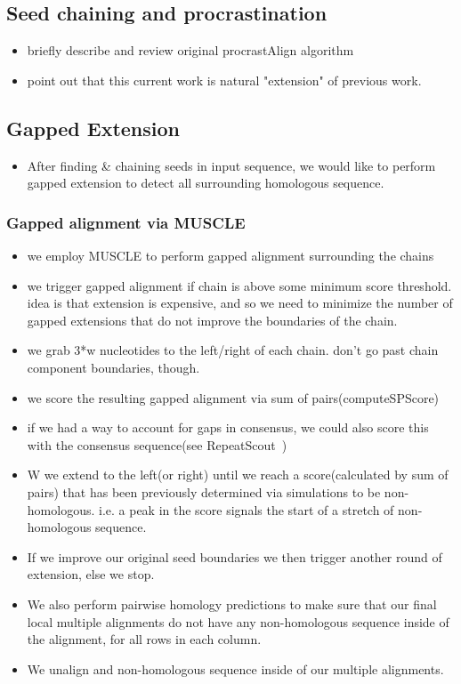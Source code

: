 \documentclass{llncs}
\begin{document}
\subsection{Seed chaining and procrastination}
\begin{itemize}
\item briefly describe and review original procrastAlign algorithm
\item point out that this current work is natural "extension" of previous work.
\end{itemize}
\subsection{Gapped Extension}
\begin{itemize}
\item After finding \& chaining seeds in input sequence, we would like to perform gapped
extension to detect all surrounding homologous sequence.
\end{itemize}
\subsubsection{Gapped alignment via MUSCLE}
\begin{itemize}
\item we employ MUSCLE to perform gapped alignment surrounding the chains

\item we trigger gapped alignment if chain is above some minimum score threshold.
idea is that extension is expensive, and so we need to minimize the number
of gapped extensions that do not improve the boundaries of the chain.

\item we grab 3*w nucleotides to the left/right of each chain. don't go past
chain component boundaries, though.

\item we score the resulting gapped alignment via sum of pairs(computeSPScore)

\item if we had a way to account for gaps in consensus, we could also
score this with the consensus sequence(see RepeatScout~\cite{ref-repeatscout})
\item W we extend to
the left(or right) until we reach a score(calculated by sum of pairs)
that has been previously determined via simulations to be
non-homologous. i.e. a peak in the score signals the start of a stretch of non-homologous sequence.  
\item If we improve our original seed boundaries we then trigger
another round of extension, else we stop. 
\item We also perform pairwise
homology predictions to make sure that our final local multiple
alignments do not have any non-homologous sequence inside of the
alignment, for all rows in each column. 
\item We
unalign and non-homologous sequence inside of our multiple alignments.



\end{itemize}
\end{document}
